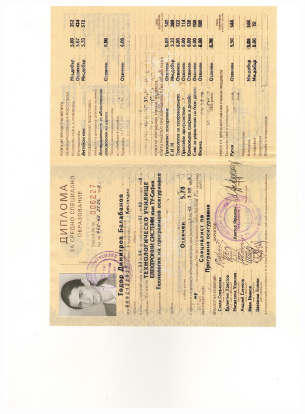 \documentclass[english,a4paper]{europasscv}
\begin{document}
\includegraphics[width=\textwidth,height=\textheight,keepaspectratio]{DiplomaTUES1998_1}
\end{document}
